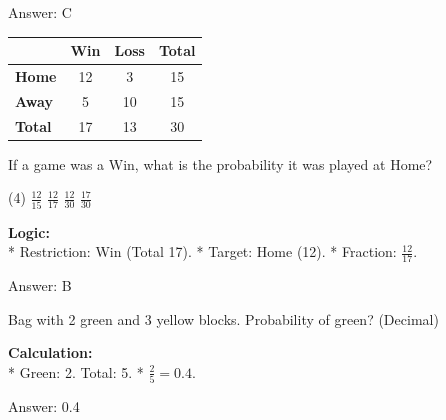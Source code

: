 \documentclass[11pt,paper=a4,answers]{exam}
\begin{document}
\begin{questions}
\begin{solution}
\vspace{30pt}

Answer: \colorbox{yellow!100}{C}
\end{solution}

\vspace{60pt}

\question
\begin{center}
\begin{tabular}{|l|c|c|c|}
\hline
 & \textbf{Win} & \textbf{Loss} & \textbf{Total} \\ \hline
\textbf{Home} & 12 & 3 & 15 \\ \hline
\textbf{Away} & 5 & 10 & 15 \\ \hline
\textbf{Total} & 17 & 13 & 30 \\ \hline
\end{tabular}
\end{center}
If a game was a Win, what is the probability it was played at Home?
\begin{tasks}(4)
    \task $\frac{12}{15}$
    \task $\frac{12}{17}$
    \task $\frac{12}{30}$
    \task $\frac{17}{30}$
\end{tasks}

\begin{solution}
\textbf{Logic:} \\
* Restriction: Win (Total 17).
* Target: Home (12).
* Fraction: $\frac{12}{17}$.

\vspace{30pt}

Answer: \colorbox{yellow!100}{B}
\end{solution}

\vspace{60pt}

\question
Bag with 2 green and 3 yellow blocks. Probability of green? (Decimal)

\begin{solution}
\textbf{Calculation:} \\
* Green: 2. Total: 5.
* $\frac{2}{5} = 0.4$.

\vspace{30pt}

Answer: \colorbox{yellow!100}{0.4}
\end{solution}

\vspace{60pt}


\end{questions}
\end{document}
